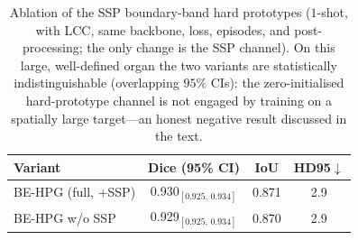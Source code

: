 \begin{table}[t]
\centering
\caption{Ablation of the SSP boundary-band hard prototypes ($1$-shot, with LCC, same backbone, loss, episodes, and post-processing; the only change is the SSP channel). On this large, well-defined organ the two variants are statistically indistinguishable (overlapping $95\%$ CIs): the zero-initialised hard-prototype channel is not engaged by training on a spatially large target---an honest negative result discussed in the text.}
\label{tab:ssp}
\begin{tabular}{lccc}
\toprule
Variant & Dice (95\% CI) & IoU & HD95$\downarrow$ \\
\midrule
BE-HPG (full, +SSP) & 0.930$_{[0.925,\,0.934]}$ & 0.871 & 2.9 \\
BE-HPG w/o SSP & 0.929$_{[0.925,\,0.934]}$ & 0.870 & 2.9 \\
\bottomrule
\end{tabular}
\end{table}
